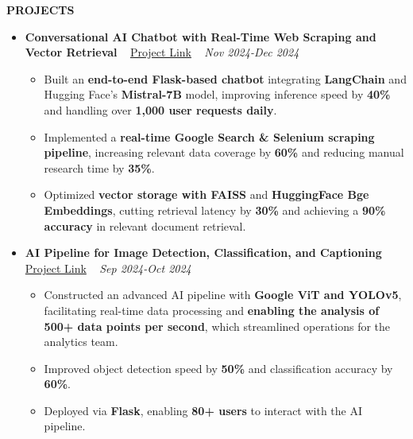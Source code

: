 \documentclass[a4paper,10pt]{article}
\newcommand{\resheading}[1]{%
  \par\noindent%
  \small%
  \colorbox{mygrey}{%
    \parbox{\dimexpr\linewidth-2\fboxsep\relax}{%
      \textbf{#1}%
    }%
  }%
  \par\nobreak%
}
\begin{document}
\resheading{\textbf{PROJECTS} }

\begin{itemize}
\vspace{-0.5mm}
\item {\bf Conversational AI Chatbot with Real-Time Web Scraping and Vector Retrieval}  
\href{https://github.com/kaushik1064/Conversational-AI-Chatbot}{Project Link}  
\textit{\hfill {Nov 2024-Dec 2024}}
\begin{itemize}
\vspace{-2mm}
\item Built an \textbf{end-to-end Flask-based chatbot} integrating \textbf{LangChain} and Hugging Face’s \textbf{Mistral-7B} model, improving inference speed by \textbf{40\%} and handling over \textbf{1,000 user requests daily}.  
\item Implemented a \textbf{real-time Google Search \& Selenium scraping pipeline}, increasing relevant data coverage by \textbf{60\%} and reducing manual research time by \textbf{35\%}.  
\item Optimized \textbf{vector storage with FAISS} and \textbf{HuggingFace Bge Embeddings}, cutting retrieval latency by \textbf{30\%} and achieving a \textbf{90\% accuracy} in relevant document retrieval.  
\vspace{-2mm}
\end{itemize}
\end{itemize}

\begin{itemize}
\vspace{-0.5mm}
\item {\bf AI Pipeline for Image Detection, Classification, and Captioning}  
\href{https://github.com/kaushik1064/INFLIECT_AI_PIPELINE-PROJECT.git}{Project Link}  
\textit{\hfill {Sep 2024-Oct 2024}}
\begin{itemize}
\vspace{-2mm}
\item Constructed an advanced AI pipeline with \textbf{Google ViT and YOLOv5}, facilitating real-time data processing and \textbf{enabling the analysis of 500+ data points per second}, which streamlined operations for the analytics team.  
\item Improved object detection speed by \textbf{50\%} and classification accuracy by \textbf{60\%}.  
\item Deployed via \textbf{Flask}, enabling \textbf{80+ users} to interact with the AI pipeline.  
\vspace{-2mm}
\end{itemize}
\end{itemize}
\end{document}
